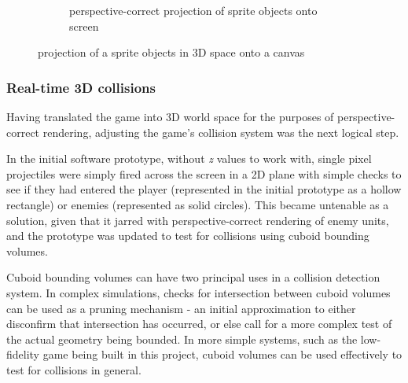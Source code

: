 \documentclass[11pt]{article}
\begin{document}
\begin{figure}[h]
\begin{subfigure}{.3\textwidth}
   \caption{perspective-correct projection of sprite objects onto screen}
   \label{fig:rotfig2}
\end{subfigure}\hfill
\caption{projection of a sprite objects in 3D space onto a canvas}
\label{fig:projection}
\end{figure}

\subsubsection*{Real-time 3D collisions}


Having translated the game into 3D world space for the purposes of perspective-correct rendering, adjusting
the game's collision system was the next logical step.

In the initial software prototype, without \textit{z} values to work with, single pixel projectiles were simply
fired across the screen in a 2D plane with simple checks to see if they had entered the player (represented in
the initial prototype as a hollow rectangle) or enemies (represented as solid circles). This became untenable
as a solution, given that it jarred with perspective-correct rendering of enemy units, and the prototype was
updated to test for collisions using cuboid bounding volumes.

Cuboid bounding volumes can have two principal uses in a collision detection system. In complex simulations,
checks for intersection between cuboid volumes can be used as a pruning mechanism - an initial approximation
to either disconfirm that intersection has occurred, or else call for a more complex test of the actual
geometry being bounded. In more simple systems, such as the low-fidelity game being built in this project,
cuboid volumes can be used effectively to test for collisions in general\cite[p. 75]{ericson}.
\end{document}
